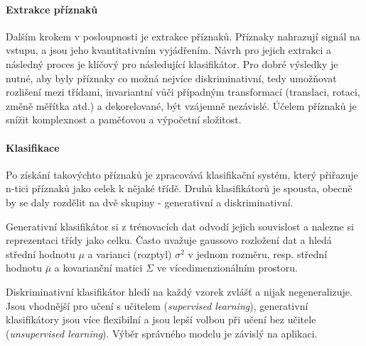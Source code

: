 \documentclass[10pt,a4paper,titlepage]{article}
\begin{document}
  \paragraph{Extrakce příznaků}
  Dalším krokem v posloupnosti je extrakce příznaků. Příznaky nahrazují signál na vstupu,
  a jsou jeho kvantitativním vyjádřením. Návrh pro jejich extrakci a následný proces je klíčový
  pro následující klasifikátor. Pro dobré výsledky je nutné, aby byly příznaky co možná nejvíce
  diskriminativní, tedy umožňovat rozlišení mezi třídami, invariantní vůči případným transformací
  (translaci, rotaci, změně měřítka atd.) a dekorelované, být vzájemně nezávislé. Účelem příznaků
  je snížit komplexnost a paměťovou a výpočetní složitost.

  \paragraph{Klasifikace}
  Po získání takovýchto příznaků je zpracovává klasifikační systém, který přiřazuje n-tici příznaků
  jako celek k nějaké třídě. Druhů klasifikátorů je spousta, obecně by se daly rozdělit na dvě
  skupiny - generativní a diskriminativní.
  
  Generativní klasifikátor si z trénovacích dat odvodí jejich souvislost a nalezne si reprezentaci
  třídy jako celku. Často uvažuje gaussovo rozložení dat a hledá střední hodnotu $\mu$ a varianci (rozptyl)
  $\sigma^2$ v jednom rozměru, resp. střední hodnotu $\bar{\mu}$ a kovarianční matici $\Sigma$ ve
  vícedimenzionálním prostoru.
  
  Diskriminativní klasifikátor hledí na každý vzorek zvlášť a nijak negeneralizuje. Jsou vhodnější
  pro učení s učitelem ({\it supervised learning}), generativní klasifikátory jsou více flexibilní
  a jsou lepší volbou při učení bez učitele ({\it unsupervised learning}). Výběr správného
  modelu je závislý na aplikaci.

\end{document}

